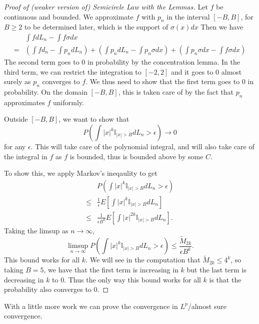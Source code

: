 \begin{proof}[Proof of (weaker version of) Semicircle Law with the Lemmas]
    Let $f$ be continuous and bounded. We approximate $f$ with $p_n$ in the interval $[-B,B]$, for $B\geq 2$ to be determined later, which is the support of $\sigma(x) dx$ Then we have \begin{align*}
        &\int f dL_n - \int f \sigma dx \\
        =&(\int f d_n -\int p_n dL_n) +(\int p_n dL_n-\int p_n\sigma dx) +(\int p_n \sigma dx - \int f \sigma dx)
    \end{align*}
    The second term goes to $0$ in probability by the concentration lemma. In the third term, we can restrict the integration to $[-2,2]$ and it goes to $0$ almost surely as $p_n$ converges to $f$. We thus need to show that the first term goes to $0$ in probability. On the domain $[-B,B]$, this is taken care of by the fact that $p_n$ approximates $f$ uniformly.

    Outside $[-B,B]$, we want to show that \[
    P(\int |x|^k \mathbb{I}_{|x|>B} dL_n >\epsilon) \to 0
    \]
    for any $\epsilon$. This will take care of the polynomial integral, and will also take care of the integral in $f$ as $f$ is bounded, thus is bounded above by some $C$.

    To show this, we apply Markov's ineqaulity to get \begin{align*}
    &P(\int |x|^k \mathbb{I}_{|x|>B} dL_n >\epsilon)\\
    \leq & \frac{1}{\epsilon} E\left[\int |x|^k \mathbb{I}_{|x|>B} dL_n \right]\\
    \leq & \frac{1}{\epsilon B^k} E\left[\int |x|^{2k} \mathbb{I}_{|x|>B} dL_n \right].
\end{align*}
Taking the limsup as $n\to \infty$, \[
\limsup_{n\to \infty}P(\int |x|^k \mathbb{I}_{|x|>B} dL_n >\epsilon) \leq \frac{\tilde{M}_{2k}}{\epsilon B^k}.
\]
    This bound works for all $k$. We will see in the computation that $\tilde{M}_{2k}\leq 4^k$, so taking $B=5$, we have that the first term is increasing in $k$ but the last term is decreasing in $k$ to $0$. Thus the only way this bound works for all $k$ is that the probability also converges to $0$. 
\end{proof}
\begin{remark}
With a little more work we can prove the convergence in $L^p$/almost sure convergence. 
\end{remark}
